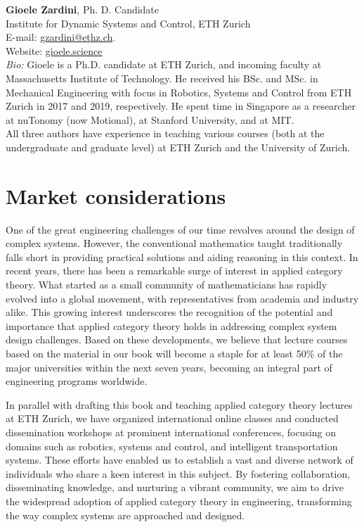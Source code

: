 \documentclass[10pt, article, one side]{memoir}
\begin{document}
    \noindent \textbf{Gioele Zardini}, Ph.
    D.
    Candidate\\
    Institute for Dynamic Systems and Control, ETH Zurich\\
    E-mail: \href{mailto:gzardini@ethz.ch}{gzardini@ethz.ch}.
    \\
    Website: \href{https://gioele.science}{gioele.science}\\
    \emph{Bio:}
    Gioele is a Ph.D.
    candidate at ETH Zurich, and incoming faculty at Massachusetts Institute of Technology.
    He received his BSc.
    and MSc. in Mechanical Engineering with focus in Robotics, Systems and Control from ETH Zurich in 2017 and 2019, respectively.
    He spent time in Singapore as a researcher at nuTonomy (now Motional), at Stanford University, and at MIT.
    \\

    All three authors have experience in teaching various courses (both at the undergraduate and graduate level) at ETH Zurich and the University of Zurich.

    \section{Market considerations}
    One of the great engineering challenges of our time revolves around the design of complex systems. However, the conventional mathematics taught traditionally falls short in providing practical solutions and aiding reasoning in this context.
    In recent years, there has been a remarkable surge of interest in applied category theory. What started as a small community of mathematicians has rapidly evolved into a global movement, with representatives from academia and industry alike.
    This growing interest underscores the recognition of the potential and importance that applied category theory holds in addressing complex system design challenges. Based on these developments, we believe that lecture courses based on the material in our book will become a staple for at least 50\% of the major universities within the next seven years, becoming an integral part of engineering programs worldwide. 

    In parallel with drafting this book and teaching applied category theory lectures at ETH Zurich, we have organized international online classes and conducted dissemination workshops at prominent international conferences,  focusing on domains such as robotics, systems and control, and intelligent transportation systems. These efforts have enabled us to establish a vast and diverse network of individuals who share a keen interest in this subject. By fostering collaboration, disseminating knowledge, and nurturing a vibrant community, we aim to drive the widespread adoption of applied category theory in engineering, transforming the way complex systems are approached and designed.
\end{document}
